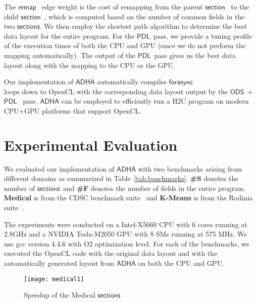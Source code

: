 \documentclass{sig-alternate-2013}
\newcommand{\remap}{\ensuremath{\mathsf{remap}}}
\newcommand{\ODS}{\ensuremath{\mathsf{ODS}}}
\newcommand{\PDL}{\ensuremath{\mathsf{PDL}}}
\newcommand{\forasync}{\ensuremath{\mathsf{forasync}}}
\newcommand{\Section}{\ensuremath{\mathsf{section}}}
\newcommand{\Sections}{\ensuremath{\mathsf{sections}}}
\newcommand{\ADHA}{\ensuremath{\mathsf{ADHA}}}
\begin{document}
 The \remap~ edge weight is the cost of  remapping from the parent \Section~ to the child \Section~, which is computed  based 
on the number of common fields in the two \Sections. We then employ the shortest path algorithm to determine the best data layout 
for the entire program.
For the \PDL~pass, we provide a tuning profile of the execution times of both the CPU and GPU 
(since we do not perform the mapping automatically).
    The output of the \PDL~pass gives us the best data layout along with the mapping to the CPU or the GPU. 

  
  Our implementation of {\ADHA} automatically compiles \forasync \\loops down to OpenCL 
with the corresponding data layout output by the \ODS~+ \PDL~ pass. {\ADHA} can be employed to efficiently run a
 H2C program on modern CPU+GPU platforms that support OpenCL. \section{Experimental Evaluation}
We evaluated our implementation of {\ADHA} with two benchmarks arising from different domains as summarized in
Table~\ref{tab:benchmarks}. \textbf{\#S} denotes the number of \Sections~and \textbf{\#F} denotes the number of fields in the entire program. 
 \textbf{Medical} is from the CDSC benchmark suite~\cite{cdsc-research} and \textbf{K-Means} is from the Rodinia suite~\cite{rodinia1}.
\begin{table}[!h]
\vspace{-5pt}
\begin{center}
\end{center}
\vspace{-10pt}
\caption{Benchmarks Description}
\label{tab:benchmarks}
\vspace{-5pt}
\end{table}

The experiments were conducted on a Intel-X5660 CPU with 6 cores running at 2.8GHz and a
 NVIDIA Tesla-M2050 GPU with 8 SMs running at 575 MHz.
We use gcc version 4.4.6 with O2 optimization level. 
For each of the benchmarks, we executed the OpenCL code with the original data layout and with the automatically generated layout from {\ADHA} 
on both the CPU and GPU.
\begin{figure}
\begin{center}
\texttt{[image: medical1]}
\vspace*{-10pt}
\caption{Speedup of the Medical \Sections }
 \label{fig:medical}
 \end{center}
\vspace{-25pt} 
\end{figure}
\end{document}
